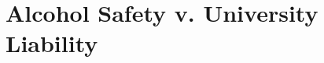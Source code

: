 

\def\thetitle{Alcohol Safety v. University Liability}
\def\shorttitle{Safety v. Liability}
\def\theauthors{Geoffrey Challen}
\def\shortauthors{Challen}


\pagestyle{document}
\thispagestyle{emptydocument}
\chapter{\thetitle}



